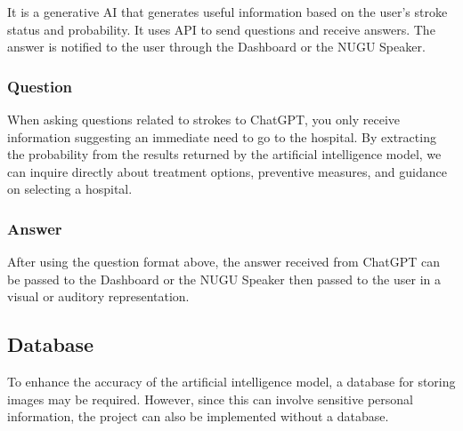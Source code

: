It is a generative AI that generates useful information based on the user's stroke status and probability. It uses API to send questions and receive answers. The answer is notified to the user through the Dashboard or the NUGU Speaker.\\
\subsubsection{\textbf{Question}}
When asking questions related to strokes to ChatGPT, you only receive information suggesting an immediate need to go to the hospital. By extracting the probability from the results returned by the artificial intelligence model, we can inquire directly about treatment options, preventive measures, and guidance on selecting a hospital.\\
\subsubsection{\textbf{Answer}}
After using the question format above, the answer received from ChatGPT can be passed to the Dashboard or the NUGU Speaker then passed to the user in a visual or auditory representation.\\

\subsection{\textbf{Database}}
To enhance the accuracy of the artificial intelligence model, a database for storing images may be required. However, since this can involve sensitive personal information, the project can also be implemented without a database.\\